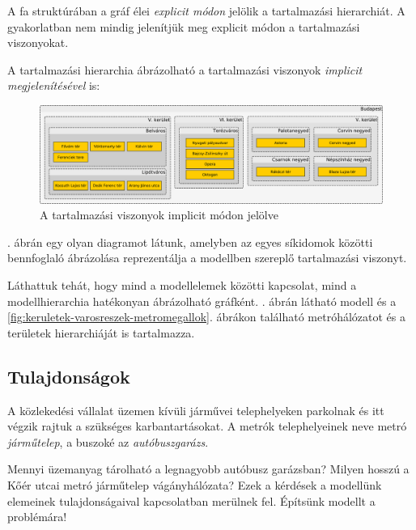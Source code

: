 \begin{megjegyzes}
	A fa struktúrában a gráf élei \emph{explicit módon} jelölik a tartalmazási hierarchiát. A gyakorlatban nem mindig jelenítjük meg explicit módon a tartalmazási viszonyokat.

	A tartalmazási hierarchia ábrázolható a tartalmazási viszonyok \emph{implicit megjelenítésével} is:

	\begin{figure}[H]
		\centering
		\includegraphics[scale=0.4]{implicit-tartalmazas}
		\caption{A tartalmazási viszonyok implicit módon jelölve}
		\label{fig:implicit-tartalmazas}
	\end{figure}

	. ábrán egy olyan diagramot látunk, amelyben az egyes síkidomok közötti bennfoglaló ábrázolása reprezentálja a modellben szereplő tartalmazási viszonyt.

\end{megjegyzes}

Láthattuk tehát, hogy mind a modellelemek közötti kapcsolat, mind a modellhierarchia hatékonyan ábrázolható gráfként. . ábrán látható modell  és a \ref{fig:keruletek-varosreszek-metromegallok}. ábrákon található metróhálózatot és a területek hierarchiáját is tartalmazza.


\subsection{Tulajdonságok}
\label{sec:tulajdonsagok}

\begin{pelda}
A közlekedési vállalat üzemen kívüli járművei telephelyeken parkolnak és itt végzik rajtuk a szükséges karbantartásokat. A metrók telephelyeinek neve metró \emph{járműtelep}, a buszoké az \emph{autóbuszgarázs}.

Mennyi üzemanyag tárolható a legnagyobb autóbusz garázsban? Milyen hosszú a Kőér utcai metró járműtelep vágányhálózata? Ezek a kérdések a modellünk elemeinek tulajdonságaival kapcsolatban merülnek fel. Építsünk modellt a problémára!
\end{pelda}

